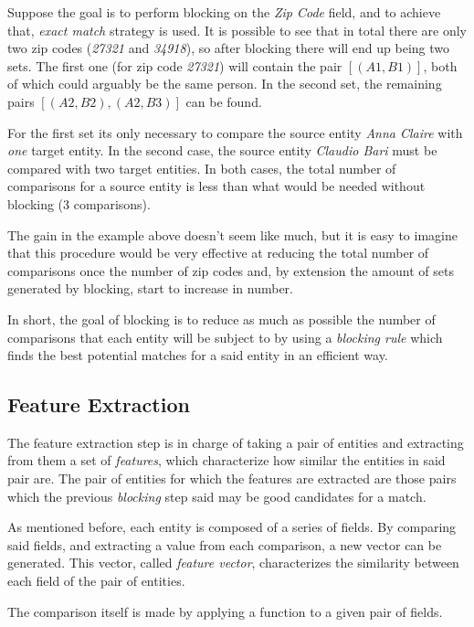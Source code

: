 \documentclass[epsfig,a4paper,11pt,titlepage,twoside,openany]{book}
\begin{document}
Suppose the goal is to perform blocking on the \textit{Zip Code} field, and to achieve that, 
\textit{exact match} strategy is used. It is possible to see that in total there are only two zip
codes (\textit{27321} and \textit{34918}), so after blocking there will end up being two sets. The first one (for zip code \textit{27321}) will contain the pair
$[(A1, B1)]$, both of which could arguably be the same person. In the second set, the remaining pairs $[(A2, B2), (A2, B3)]$ can be found.

For the first set its only necessary to compare the source entity \textit{Anna Claire}
with \textit{one} target entity. In the second case, the
source entity \textit{Claudio Bari} must be compared with two target entities. In both cases, the
total number of comparisons for a source entity is less than what would be needed
without blocking (3 comparisons).

The gain in the example above doesn't seem like much, but it is easy to imagine that
this procedure would be very effective at reducing the total number of
comparisons once the number of zip codes and, by extension the amount of sets
generated by blocking, start to increase in number.

In short, the goal of blocking is to reduce as much as possible the number of
comparisons that each entity will be subject to by using a \textit{blocking
  rule} which finds the best potential matches for a said entity in an efficient
way.

  
\subsection{Feature Extraction}
\label{sec:rl-workflow-feat-extraction}

The feature extraction step is in charge of taking a pair of entities and
extracting from them a set of \textit{features}, which characterize how similar
the entities in said pair are. The pair of entities for which the features are extracted
are those pairs which the previous \textit{blocking} step said may be good
candidates for a match.

As mentioned before, each entity is composed of a series of fields. By comparing said fields, and extracting a value from each comparison, a new vector can be generated. This vector, called \textit{feature vector}, characterizes the similarity between each field of the pair of entities.

The comparison itself is made by applying a function to a given pair of fields. 
\end{document}
